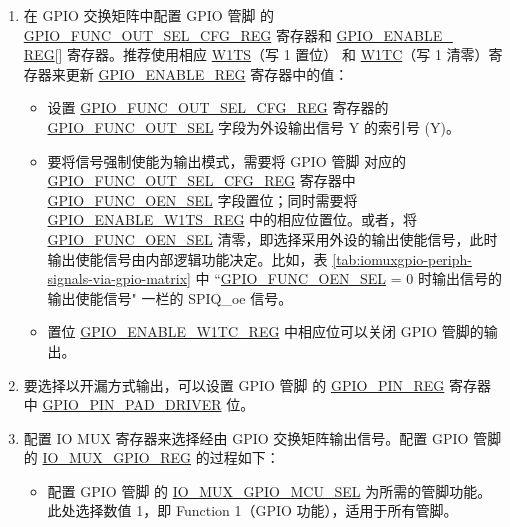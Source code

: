 \documentclass[main\_\_CN.tex]{subfiles}
\begin{document}
\begin{enumerate}
    \item 在 GPIO 交换矩阵中配置 GPIO 管脚  的 \hyperref[regdesc:GPIOFUNCNOUTSELCFGREG]{GPIO\_FUNC\_OUT\_SEL\_CFG\_REG} 寄存器和 \hyperref[regdesc:GPIOENABLEREG]{GPIO\_ENABLE\_\\REG}[] 寄存器。推荐使用相应 \hyperref[regdesc:GPIOENABLEW1TSREG]{W1TS}（写 1 置位） 和 \hyperref[regdesc:GPIOENABLEW1TCREG]{W1TC}（写 1 清零）寄存器来更新 \hyperref[regdesc:GPIOENABLEREG]{GPIO\_ENABLE\_REG} 寄存器中的值：

    \begin{itemize}
        \item 设置 \hyperref[regdesc:GPIOFUNCNOUTSELCFGREG]{GPIO\_FUNC\_OUT\_SEL\_CFG\_REG} 寄存器的 \hyperref[fielddesc:GPIOFUNCNOUTSEL]{GPIO\_FUNC\_OUT\_SEL} 字段为外设输出信号 Y 的索引号 (Y)。
        \item 要将信号强制使能为输出模式，需要将 GPIO 管脚   对应的 \hyperref[regdesc:GPIOFUNCNOUTSELCFGREG]{GPIO\_FUNC\_OUT\_SEL\_CFG\_REG} 寄存器中 \hyperref[fielddesc:GPIOFUNCNOENSEL]{GPIO\_FUNC\_OEN\_SEL} 字段置位；同时需要将 \hyperref[regdesc:GPIOENABLEW1TSREG]{GPIO\_ENABLE\_W1TS\_REG} 中的相应位置位。或者，将 \hyperref[fielddesc:GPIOFUNCNOENSEL]{GPIO\_FUNC\_OEN\_SEL} 清零，即选择采用外设的输出使能信号，此时输出使能信号由内部逻辑功能决定。比如，表 \ref{tab:iomuxgpio-periph-signals-via-gpio-matrix} 中 ``\hyperref[fielddesc:GPIOFUNCNOENSEL]{GPIO\_FUNC\_OEN\_SEL} = 0 时输出信号的输出使能信号" 一栏的 SPIQ\_oe 信号。
       \item 置位 \hyperref[regdesc:GPIOENABLEW1TCREG]{GPIO\_ENABLE\_W1TC\_REG} 中相应位可以关闭 GPIO 管脚的输出。
    \end{itemize}
    \item 要选择以开漏方式输出，可以设置 GPIO 管脚  的 \hyperref[regdesc:GPIOPINNREG]{GPIO\_PIN\_REG} 寄存器中 \hyperref[fielddesc:GPIOPINNPADDRIVER]{GPIO\_PIN\_PAD\_DRIVER} 位。
    \item 配置 IO MUX 寄存器来选择经由 GPIO 交换矩阵输出信号。配置 GPIO 管脚  的 \hyperref[regdesc:IOMUXGPIONREG]{IO\_MUX\_GPIO\_REG} 的过程如下：
    \begin{itemize}
        \item 配置 GPIO 管脚  的 \hyperref[fielddesc:IOMUXGPIONMCUSEL]{IO\_MUX\_GPIO\_MCU\_SEL} 为所需的管脚功能。此处选择数值 1，即 Function 1（GPIO 功能），适用于所有管脚。

\end{itemize}
\end{enumerate}
\end{document}
